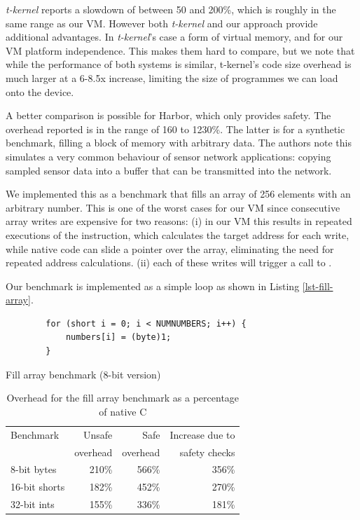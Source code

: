 \emph{t-kernel} reports a slowdown of between 50 and 200\%, which is roughly in the same range as our VM. However both \emph{t-kernel} and our approach provide additional advantages. In \emph{t-kernel}'s case a form of virtual memory, and for our VM platform independence. This makes them hard to compare, but we note that while the performance of both systems is similar, t-kernel's code size overhead is much larger at a 6-8.5x increase, limiting the size of programmes we can load onto the device.

A better comparison is possible for Harbor, which only provides safety. The overhead reported is in the range of 160 to 1230\%. The latter is for a synthetic benchmark, filling a block of memory with arbitrary data. The authors note this simulates a very common behaviour of sensor network applications: copying sampled sensor data into a buffer that can be transmitted into the network.

We implemented this as a benchmark that fills an array of 256 elements with an arbitrary number. This is one of the worst cases for our VM since consecutive array writes are expensive for two reasons: (i) in our VM this results in repeated executions of the  instruction, which calculates the target address for each write, while native code can slide a pointer over the array, eliminating the need for repeated address calculations. (ii) each of these writes will trigger a call to .

Our benchmark is implemented as a simple loop as shown in Listing \ref{lst-fill-array}.

\begin{listing}[H]
	\centering
 	\begin{verbatim}
        for (short i = 0; i < NUMNUMBERS; i++) {
            numbers[i] = (byte)1;
        }
	\end{verbatim}
	\caption{Fill array benchmark (8-bit version)}
	\label{lst-fill-array}
\end{listing}

\begin{table}[]
 \centering
 \caption{Overhead for the fill array benchmark as a percentage of native C}
 \label{tbl-fill-array-results}
\begin{tabular}{lrrr}
\toprule
Benchmark & Unsafe & Safe & Increase due to \\
 & overhead & overhead & safety checks \\
\midrule
8-bit  bytes  & 210\% & 566\% & 356\% \\
16-bit shorts & 182\% & 452\% & 270\% \\
32-bit ints   & 155\% & 336\% & 181\% \\
\bottomrule
\end{tabular}
\end{table}

